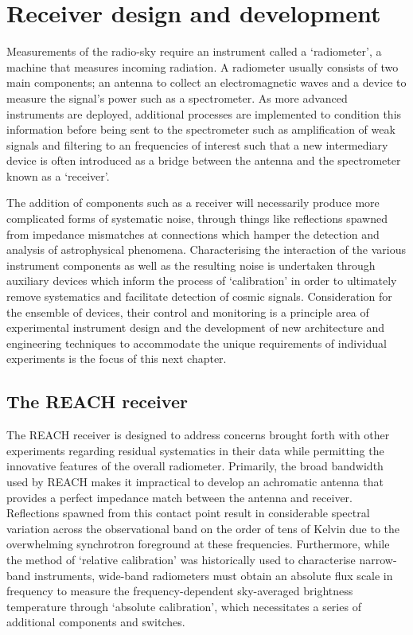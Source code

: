 \chapter{Receiver design and development}\label{chap:instrumentation}

\ifpdf
    \graphicspath{{instrumentation/figs/Raster/}{instrumentation/figs/PDF/}{instrumentation/figs/}}
\else
    \graphicspath{{instrumentation/figs/Vector/}{instrumentation/figs/}}
\fi

Measurements of the radio-sky require an instrument called a ‘radiometer’, a machine that measures incoming radiation. A radiometer usually consists of two main components; an antenna to collect an electromagnetic waves and a device to measure the signal's power such as a spectrometer. As more advanced instruments are deployed, additional processes are implemented to condition this information before being sent to the spectrometer such as amplification of weak signals and filtering to an frequencies of interest such that a new intermediary device is often introduced as a bridge between the antenna and the spectrometer known as a ‘receiver’.

The addition of components such as a receiver will necessarily produce more complicated forms of systematic noise, through things like reflections spawned from impedance mismatches at connections which hamper the detection and analysis of astrophysical phenomena. Characterising the interaction of the various instrument components as well as the resulting noise is undertaken through auxiliary devices which inform the process of ‘calibration’ in order to ultimately remove systematics and facilitate detection of cosmic signals. Consideration for the ensemble of devices, their control and monitoring is a principle area of experimental instrument design and the development of new architecture and engineering techniques to accommodate the unique requirements of individual experiments is the focus of this next chapter.


\section{The REACH receiver}\label{sec:receiver_general}
The REACH receiver is designed to address concerns brought forth with other experiments regarding residual systematics in their data while permitting the innovative features of the overall radiometer. Primarily, the broad bandwidth used by REACH makes it impractical to develop an achromatic antenna that provides a perfect impedance match between the antenna and receiver. Reflections spawned from this contact point result in considerable spectral variation across the observational band on the order of tens of Kelvin due to the overwhelming synchrotron foreground at these frequencies. Furthermore, while the method of ‘relative calibration’ was historically used to characterise narrow-band instruments, wide-band radiometers must obtain an absolute flux scale in frequency to measure the frequency-dependent sky-averaged brightness temperature through ‘absolute calibration’, which necessitates a series of additional components and switches.


